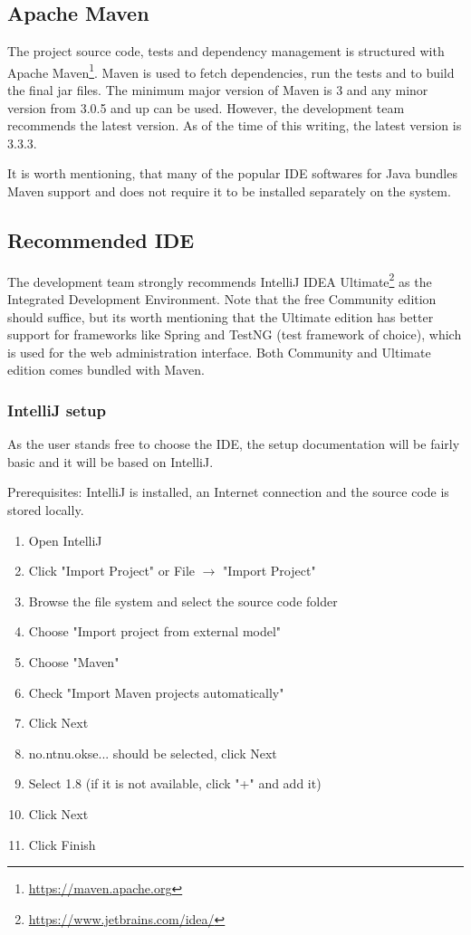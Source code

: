 \subsection{Apache Maven}
The project source code, tests and dependency management is structured with Apache Maven\footnote{\url{https://maven.apache.org}}. Maven is used to fetch dependencies, run the tests and to build the final jar files. The minimum major version of Maven is 3 and any minor version from 3.0.5 and up can be used. However, the development team recommends the latest version. As of the time of this writing, the latest version is 3.3.3.

It is worth mentioning, that many of the popular IDE softwares for Java bundles Maven support and does not require it to be installed separately on the system.

\subsection{Recommended IDE}
The development team strongly recommends IntelliJ IDEA Ultimate\footnote{\url{https://www.jetbrains.com/idea/}} as the Integrated Development Environment. Note that the free Community edition should suffice, but its worth mentioning that the Ultimate edition has better support for frameworks like Spring and TestNG (test framework of choice), which is used for the web administration interface. Both Community and Ultimate edition comes bundled with Maven.

\subsubsection{IntelliJ setup}
As the user stands free to choose the IDE, the setup documentation will be fairly basic and it will be based on IntelliJ.

Prerequisites: IntelliJ is installed, an Internet connection and the source code is stored locally.

\begin{enumerate}
\setlength{\itemsep}{0cm}%
    \item Open IntelliJ
    \item Click "Import Project" or File $\rightarrow$ "Import Project"
    \item Browse the file system and select the source code folder
    \item Choose "Import project from external model"
    \item Choose "Maven"
    \item Check "Import Maven projects automatically"
    \item Click Next
    \item no.ntnu.okse... should be selected, click Next
    \item Select 1.8 (if it is not available, click "+" and add it)
    \item Click Next
    \item Click Finish
\end{enumerate}

